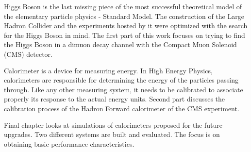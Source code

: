 Higgs Boson is the last missing piece of the most successful theoretical model of the elementary particle physics - Standard Model. The construction of the Large Hadron Collider and the experiments hosted by it were optimized with the search for the Higgs Boson in mind. The first part of this work focuses on trying to find the Higgs Boson in a dimuon decay channel with the Compact Muon Solenoid (CMS) detector.


Calorimeter is a device for measuring energy. In High Energy Physics, calorimeters are responsible for determining the energy of the particles passing through. Like any other measuring system, it needs to be calibrated to associate properly its response to the actual energy units. Second part discusses the calibration process of the Hadron Forward calorimeter of the CMS experiment.

Final chapter looks at simulations of calorimeters proposed for the future upgrades. Two different systems are built and evaluated. The focus is on obtaining basic performance characteristics.

